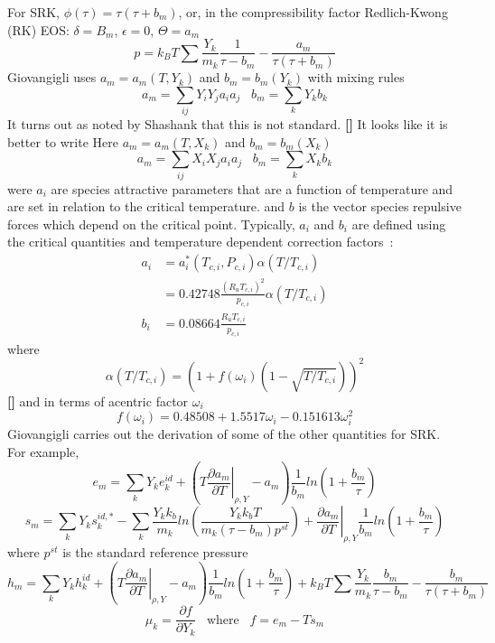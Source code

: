 \documentclass[11pt]{article}
\newcommand{\MarginPar}[1]{\marginpar{%
\vskip-\baselineskip %
\raggedright\tiny\sffamily
\hrule\smallskip{\color{red}#1}\par\smallskip\hrule}}
\newcommand{\jbb}[1]{{\bf[{\color{red}{JBB:  #1}}]}}
\begin{document}
For SRK, $\phi(\tau) = \tau(\tau+b_m)$, or, in the compressibility factor 
Redlich-Kwong (RK) EOS: $\delta = B_{m}$, $\epsilon = 0$, $\Theta = a_{m}$ \MarginPar{fix to be SRK}
\[
\label{eq:pSRK}
p = k_B T \sum \frac{Y_k}{m_k} \frac{1}{\tau - b_m} - \frac{a_m}{\tau(\tau + b_m)}
\]
Giovangigli uses $a_m = a_m(T, Y_k)$ and $b_m = b_m(Y_k)$
with mixing rules
\[
a_m = \sum_{ij} Y_i Y_j a_i a_j \;\;\;  b_m = \sum_k Y_k b_k
\]
It turns out as noted by Shashank that this is not standard. \jbb{My bad.}
It looks like it is better to write
Here $a_m = a_m(T, X_k)$ and $b_m = b_m(X_k)$
\[
a_m = \sum_{ij} X_i X_j a_i a_j \;\;\;  b_m = \sum_k X_k b_k
\]
were $a_i$ are species attractive parameters that are a function of temperature and are
set in relation to the critical temperature. and $b$ is the vector species repulsive forces which depend on the critical point.
Typically, $a_i$ and $b_i$ are defined using the critical quantities and temperature dependent correction factors~\cite{poling2001properties}:
\begin{align}
a_i &= a_i^{*}\left(T_{c,i},P_{c,i}\right) \alpha(T/T_{c,i})  \nonumber \\
       &= 0.42748 \frac{\left(R_u T_{c,i} \right)^2}{p_{c,i}} \alpha \left(T/T_{c,i}\right)  \nonumber \\
 b_i &= 0.08664 \frac{R_u T_{c,i}}{p_{c,i}}   
       \label{eq:abformEOS}
\end{align}
where
\[
\alpha(T/T_{c,i}) = \left(1 + f\left( \omega_i \right) \left(1-\sqrt{T/T_{c,i}} \right) \right)^2
\]
\jbb{One would like to use a mollified version of the $\alpha$ to smooth behavior near critical point}
and in terms of acentric factor $\omega_i$
\[
f\left( \omega_i \right) = 0.48508 + 1.5517 \omega_i - 0.151613 \omega_{i}^2
\]
Giovangigli carries out the derivation of some of the other quantities for SRK. For example,
\[
e_m = \sum_k Y_k e_k^{id} + \left( T \left . \frac{\partial a_m}{\partial T} \right |_{\rho,Y} - a_m \right)
\frac{1}{b_m} ln ( 1 + \frac{b_m}{\tau})
\]
\[
s_m = \sum_k Y_k s_k^{id,*} - \sum_k \frac{Y_k k_b}{m_k} ln  \left( \frac{Y_k k_b T}{m_k (\tau -b_m) p^{st}}   \right )
+ \left . \frac{\partial a_m}{\partial T} \right |_{\rho,Y} \frac{1}{b_m} ln ( 1 + \frac{b_m}{\tau})
\]
where $p^{st}$ is the standard reference pressure
\[
\label{eq:hmSRK}
h_m = \sum_k Y_k h_k^{id} + \left ( T \left . \frac{\partial a_m}{\partial T} \right |_{\rho,Y} - a_m \right)
\frac{1}{b_m} ln ( 1 + \frac{b_m}{\tau})
+ 
k_B T \sum \frac{Y_k}{m_k} \frac{b_m}{\tau -b_m} - \frac{b_m}{\tau(\tau + b_m)}
\]
\[
\mu_k = \frac{\partial f}{\partial Y_k} \;\;\; \mathrm{where} \;\;\;  f = e_m - T s_m
\]
\end{document}
